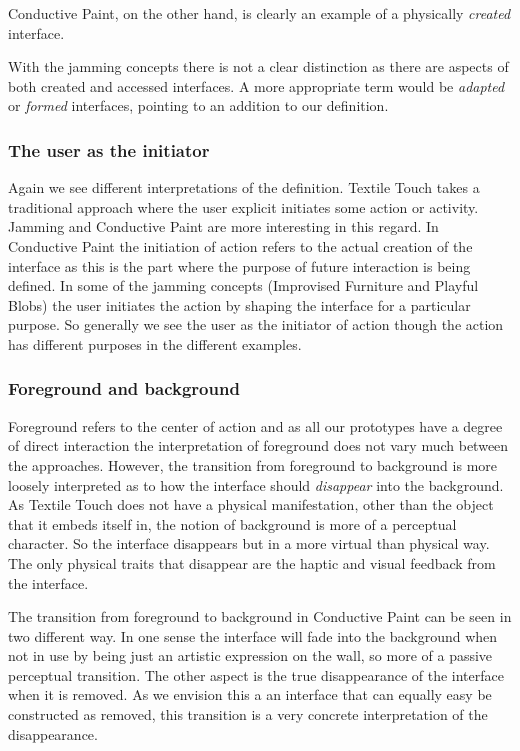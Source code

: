 Conductive Paint, on the other hand, is clearly an example of a physically \emph{created} interface.

With the jamming concepts there is not a clear distinction as there are aspects of both created and accessed interfaces.
A more appropriate term would be \emph{adapted} or \emph{formed} interfaces, pointing to an addition to our definition.

\subsubsection{The user as the initiator} 
Again we see different interpretations of the definition.
Textile Touch takes a traditional approach where the user explicit initiates some action or activity.
Jamming and Conductive Paint are more interesting in this regard.
In Conductive Paint the initiation of action refers to the actual creation of the interface as this is the part where the purpose of future interaction is being defined.
In some of the jamming concepts (Improvised Furniture and Playful Blobs) the user initiates the action by shaping the interface for a particular purpose.
So generally we see the user as the initiator of action though the action has different purposes in the different examples.

\subsubsection{Foreground and background}
Foreground refers to the center of action and as all our prototypes have a degree of direct interaction the interpretation of foreground does not vary much between the approaches.
However, the transition from foreground to background is more loosely interpreted as to how the interface should \emph{disappear} into the background.
As Textile Touch does not have a physical manifestation, other than the object that it embeds itself in, the notion of background is more of a perceptual character.
So the interface disappears but in a more virtual than physical way.
The only physical traits that disappear are the haptic and visual feedback from the interface.

The transition from foreground to background in Conductive Paint can be seen in two different way.
In one sense the interface will fade into the background when not in use by being just an artistic expression on the wall, so more of a passive perceptual transition.
The other aspect is the true disappearance of the interface when it is removed.
As we envision this a an interface that can equally easy be constructed as removed, this transition is a very concrete interpretation of the disappearance.

